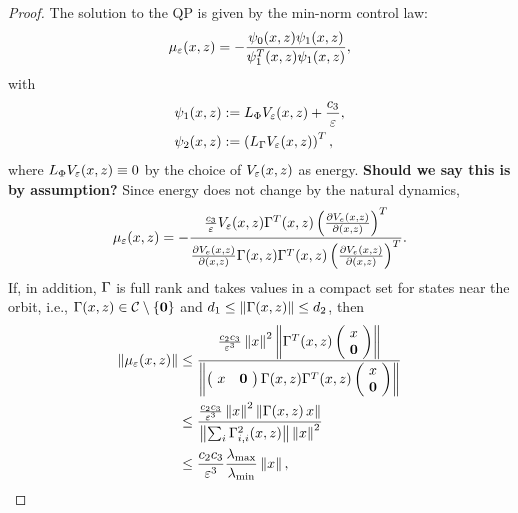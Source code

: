 \documentclass[twocolumn]{article}
\begin{document}
\begin{proof}
  The solution to the QP is given by the min-norm control law:
  \begin{align}
    \mu_{\varepsilon}(x, z) = -\frac{\psi_{0}(x, z) \psi_{1}(x, z)}{\psi_{1}^{T}(x, z) \psi_{1}(x, z)},
  \end{align}
  with
  \begin{align}
    \nonumber
    \psi_{1}(x, z) &:= L_{\Phi} V_{\varepsilon}(x, z) + \frac{c_{3}}{\varepsilon},\\
    \psi_{2}(x, z) &:= \left( L_{\Gamma} V_{\varepsilon}(x, z) \right)^{T},
  \end{align}
  where $L_{\Phi} V_{\varepsilon}(x, z) \equiv 0$ by the choice of $V_{\varepsilon}(x, z)$ as energy.
  {\bf Should we say this is by assumption?}
  Since energy does not change by the natural dynamics,
  \begin{align}
    \mu_{\varepsilon}(x, z) = - \frac{\frac{c_{3}}{\varepsilon} V_{\varepsilon}(x, z) \Gamma^{T}(x, z) \left( \frac{\partial{V_{e}(x, z)}}{\partial{(x, z)}} \right)^{T}}{\frac{\partial{V_{e}(x, z)}}{\partial{(x, z)}} \Gamma(x, z) \Gamma^{T}(x, z) \left( \frac{\partial{V_{e}(x, z)}}{\partial{(x, z)}} \right)^{T}}.
  \end{align}
  If, in addition, $\Gamma$ is full rank and takes values in a compact set for states near the orbit, i.e., $\Gamma(x, z) \in \mathcal{C} \setminus \{{\mathbf 0}\}$ and $d_{1} \leq \| \Gamma(x, z) \| \leq d_{2}$, then
  \begin{align}
    \nonumber
    \| \mu_{\varepsilon}(x, z) \|
    &\leq \frac{\frac{c_{2}c_{3}}{\varepsilon^3} \left\|x\right\|^{2} \left\| \Gamma^{T}(x, z)
      \left(\!\begin{array}{c}
      x\\
      {\mathbf 0}
      \end{array}\!\right)\right\|}{\left\|
      \left(\!\begin{array}{c c}
      x & {\mathbf 0}
      \end{array}\!\right) \Gamma(x, z) \Gamma^{T}(x, z)
      \left(\!\begin{array}{c}
      x\\
      {\mathbf 0}
      \end{array}\!\right) \right\|}\\
    \nonumber
    &\leq \frac{\frac{c_{2}c_{3}}{\varepsilon^{3}} \left\|x\right\|^{2} \left\| \Gamma(x, z)
      \, x \right\|}{\left\|
      \sum_{i} \Gamma_{i,i}^{2}(x, z) \right\| \left\|x\right\|^{2}}\\
    \label{eq:mueps-bounds}
    &\leq \frac{c_{2}c_{3}}{\varepsilon^{3}} \frac{\lambda_{\mathrm{max}}}{\lambda_{\mathrm{min}}} \left\|x\right\|,
  \end{align}

\end{proof}
\end{document}
